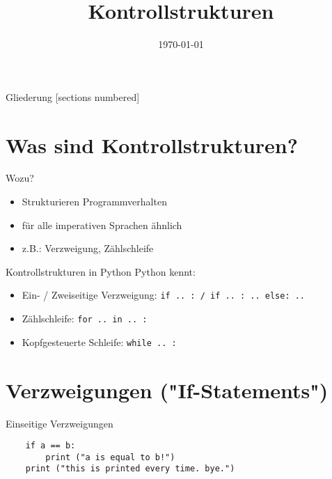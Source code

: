 



\title{Kontrollstrukturen}
\date{\today}




\maketitle

\begin{frame}{Gliederung}
    [sections numbered]
    \tableofcontents
\end{frame}

\section{Was sind Kontrollstrukturen?}
\begin{frame}{Wozu?}
    \begin{itemize}
        \item Strukturieren Programmverhalten
        \item für alle imperativen Sprachen ähnlich
        \item z.B.: Verzweigung, Zählschleife
    \end{itemize}
\end{frame}

\begin{frame}{Kontrollstrukturen in Python}
    Python kennt:
    \begin{itemize}
        \item Ein- / Zweiseitige Verzweigung: \texttt{if .. : / if .. : .. else: ..}
        \item Zählschleife: \texttt{for .. in .. :}
        \item Kopfgesteuerte Schleife: \texttt{while .. :}
    \end{itemize}
\end{frame}
\section{Verzweigungen ("{}If-Statements"{})}
\begin{frame}[fragile]{Einseitige Verzweigungen}
    \begin{lstlisting}
    if a == b:
        print ("a is equal to b!")
    print ("this is printed every time. bye.")
    \end{lstlisting}
\end{frame}

